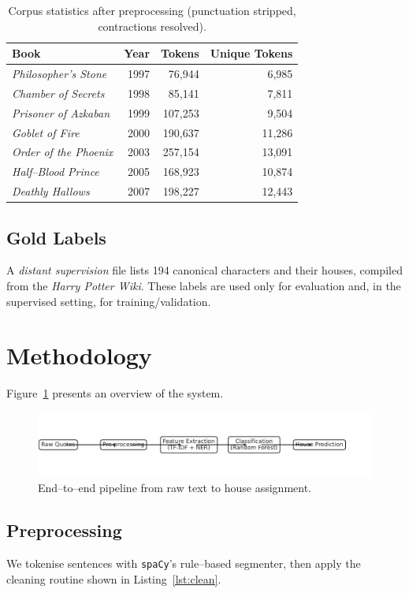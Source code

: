 \documentclass[12pt]{article}
\begin{document}
\begin{table}[H]
\centering
\caption{Corpus statistics after preprocessing (punctuation stripped, contractions resolved).}
\begin{tabular}{lrrr}
\hline
\textbf{Book} & \textbf{Year} & \textbf{Tokens} & \textbf{Unique Tokens} \\
\hline
\textit{Philosopher's Stone} & 1997 & 76,944 & 6,985 \\
\textit{Chamber of Secrets} & 1998 & 85,141 & 7,811 \\
\textit{Prisoner of Azkaban} & 1999 & 107,253 & 9,504 \\
\textit{Goblet of Fire} & 2000 & 190,637 & 11,286 \\
\textit{Order of the Phoenix} & 2003 & 257,154 & 13,091 \\
\textit{Half--Blood Prince} & 2005 & 168,923 & 10,874 \\
\textit{Deathly Hallows} & 2007 & 198,227 & 12,443 \\
\hline
\end{tabular}
\label{tab:corpusstats}
\end{table}

\subsection{Gold Labels}
A \emph{distant supervision} file lists 194 canonical characters and their houses, compiled from the \textit{Harry Potter Wiki}. 
These labels are used only for evaluation and, in the supervised setting, for training/validation.

\section{Methodology}
\label{sec:method}
Figure~\ref{fig:pipeline} presents an overview of the system.

\begin{figure}[H]
\centering
\includegraphics[width=0.9\linewidth]{pipeline.pdf}
\caption{End--to--end pipeline from raw text to house assignment.}
\label{fig:pipeline}
\end{figure}

\subsection{Preprocessing}
We tokenise sentences with \texttt{spaCy}'s rule--based segmenter, then apply the cleaning routine shown in Listing~\ref{lst:clean}.
\end{document}
